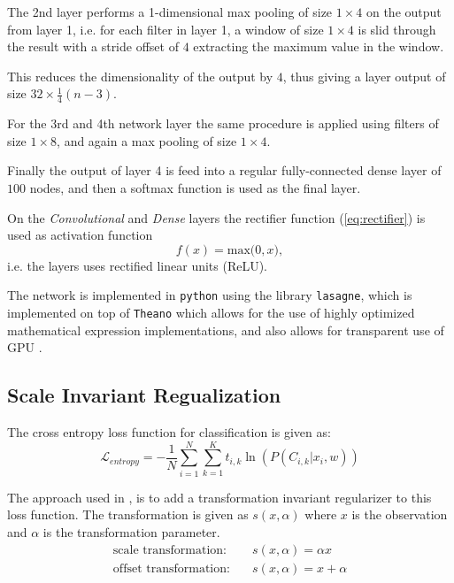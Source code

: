 The 2nd layer performs a 1-dimensional max pooling of size $1 \times 4$ on the output from layer 1, i.e. for each filter in layer 1, a window of size $1 \times 4$ is slid through the result with a stride offset of $4$ extracting the maximum value in the window.

This reduces the dimensionality of the output by $4$, thus giving a layer output of size $32 \times \frac{1}{4}(n-3)$.

For the 3rd and 4th network layer the same procedure is applied using filters of size $1 \times 8$, and again a max pooling of size $1 \times 4$.

Finally the output of layer 4 is feed into a regular fully-connected dense layer of $100$ nodes, and then a softmax function is used as the final layer.

On the \emph{Convolutional} and \emph{Dense} layers the rectifier function (\cref{eq:rectifier}) is used as activation function
\begin{equation}
  f(x) = \text{max(}0, x\text{)},
  \label{eq:rectifier}
\end{equation}
i.e. the layers uses rectified linear units (ReLU).

The network is implemented in \texttt{python} using the library \texttt{lasagne}, which is implemented on top of \texttt{Theano} which allows for the use of highly optimized mathematical expression implementations, and also allows for transparent use of GPU \cite{theano}.

\subsection{Scale Invariant Regualization}

The cross entropy loss function for classification is given as:
\begin{equation}
\mathcal{L}_{entropy} = - \frac{1}{N} \sum_{i=1}^N \sum_{k=1}^K t_{i,k} \ln(P(C_{i,k} | x_i, w))
\end{equation}

The approach used in \cite{scale-invariante}, is to add a transformation invariant regularizer to this loss function. The transformation is given as $s(x, \alpha)$ where $x$ is the observation and $\alpha$ is the transformation parameter.
\begin{align}
\text{scale transformation:}&\quad s(x, \alpha) = \alpha x\\
\text{offset transformation:}&\quad s(x, \alpha) = x + \alpha
\end{align}

